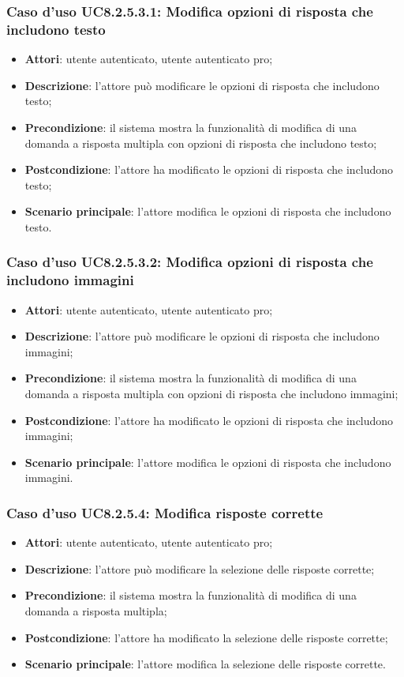 \subsubsection{Caso d'uso UC8.2.5.3.1: Modifica opzioni di risposta che includono testo}
	\begin{itemize}
		\item
			\textbf{Attori}: utente autenticato, utente autenticato pro;
		\item		
			\textbf{Descrizione}: l'attore può modificare le opzioni di risposta che includono testo;
		\item
			\textbf{Precondizione}: il sistema mostra la funzionalità di modifica di una domanda a risposta multipla con opzioni di risposta che includono testo; 
		\item
			\textbf{Postcondizione}: l'attore ha modificato le opzioni di risposta che includono testo;
		\item
			\textbf{Scenario principale}: l'attore modifica le opzioni di risposta che includono testo. 			
	\end{itemize}	
	
\subsubsection{Caso d'uso UC8.2.5.3.2: Modifica opzioni di risposta che includono immagini}
	\begin{itemize}
		\item
			\textbf{Attori}: utente autenticato, utente autenticato pro;
		\item		
			\textbf{Descrizione}: l'attore può modificare le opzioni di risposta che includono immagini;
		\item
			\textbf{Precondizione}: il sistema mostra la funzionalità di modifica di una domanda a risposta multipla con opzioni di risposta che includono immagini; 
		\item
			\textbf{Postcondizione}: l'attore ha modificato le opzioni di risposta che includono immagini;
		\item
			\textbf{Scenario principale}: l'attore modifica le opzioni di risposta che includono immagini. 			
	\end{itemize}
	
\subsubsection{Caso d'uso UC8.2.5.4: Modifica risposte corrette}
	\begin{itemize}
		\item
			\textbf{Attori}: utente autenticato, utente autenticato pro;
		\item		
			\textbf{Descrizione}: l'attore può modificare la selezione delle risposte corrette;
		\item
			\textbf{Precondizione}: il sistema mostra la funzionalità di modifica di una domanda a risposta multipla;
		\item
			\textbf{Postcondizione}: l'attore ha modificato la selezione delle risposte corrette;
		\item
			\textbf{Scenario principale}: l'attore modifica la selezione delle risposte corrette. 			
	\end{itemize}
